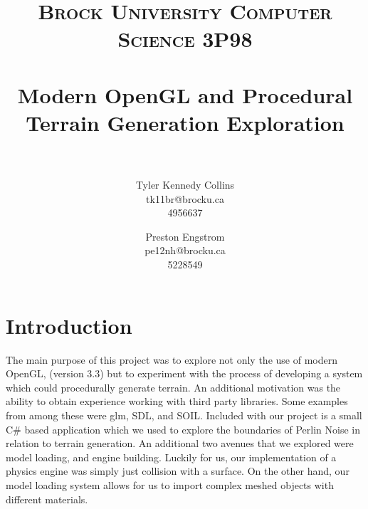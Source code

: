 \documentclass[paper=a4, fontsize=11pt]{scrartcl}
\title{
		\usefont{OT1}{bch}{b}{n}
		\normalfont \normalsize \textsc{Brock University Computer Science 3P98} \\ [25pt]
		\horrule{0.5pt} \\[0.4cm]
		\huge Modern OpenGL and Procedural Terrain Generation Exploration \\
		\horrule{2pt} \\[0.5cm]
}
\author{
		\normalfont 								\normalsize
        Tyler Kennedy Collins\\[-3pt]				\normalsize
        tk11br@brocku.ca\\[-3pt]					\normalsize
        4956637\\									\normalsize
        \and
        Preston Engstrom\\[-3pt]					\normalsize
        pe12nh@brocku.ca\\[-3pt]					\normalsize
        5228549\\									\normalsize
}
\date{}
\numberwithin{equation}{section}		%
\numberwithin{figure}{section}			%
\numberwithin{table}{section}				%
\begin{document}
\maketitle
\section{Introduction}
The main purpose of this project was to explore not only the use of modern OpenGL, (version 3.3) but to experiment with the process of developing a system which could procedurally generate terrain. An additional motivation was the ability to obtain experience working with third party libraries. Some examples from among these were glm, SDL, and SOIL. Included with our project is a small C\# based application which we used to explore the boundaries of Perlin Noise in relation to terrain generation. An additional two avenues that we explored were model loading, and engine building. Luckily for us, our implementation of a physics engine was simply just collision with a surface. On the other hand, our model loading system allows for us to import complex meshed objects with different materials.

\end{document}
